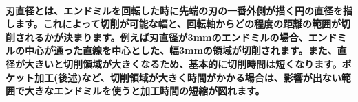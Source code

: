 \documentclass[b5paper, 9pt, twocolumn, titlepage,openany]{jsbook}%
\begin{document}

\paragraph{刃直径とは、エンドミルを回転した時に先端の刃の一番外側が描く円の直径を指します。これによって切削が可能な幅と、回転軸からどの程度の距離の範囲が切削されるかが決まります。例えば刃直径が3mmのエンドミルの場合、エンドミルの中心が通った直線を中心とした、幅3mmの領域が切削されます。また、直径が大きいと切削領域が大きくなるため、基本的に切削時間は短くなります。ポケット加工(後述)など、切削領域が大きく時間がかかる場合は、影響が出ない範囲で大きなエンドミルを使うと加工時間の短縮が図れます。}
\end{document}
